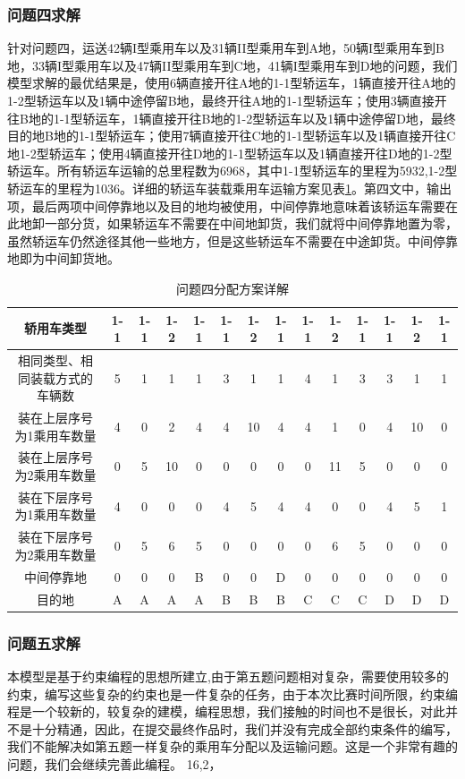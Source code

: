 \documentclass[UTF8]{ctexart}
\begin{document}
\subsubsection{问题四求解}
针对问题四，运送42辆I型乘用车以及31辆II型乘用车到A地，50辆I型乘用车到B地，33辆I型乘用车以及47辆II型乘用车到C地，41辆I型乘用车到D地的问题，我们模型求解的最优结果是，使用6辆直接开往A地的1-1型轿运车，1辆直接开往A地的1-2型轿运车以及1辆中途停留B地，最终开往A地的1-1型轿运车；使用3辆直接开往B地的1-1型轿运车，1辆直接开往B地的1-2型轿运车以及1辆中途停留D地，最终目的地B地的1-1型轿运车；使用7辆直接开往C地的1-1型轿运车以及1辆直接开往C地1-2型轿运车；使用4辆直接开往D地的1-1型轿运车以及1辆直接开往D地的1-2型轿运车。所有轿运车运输的总里程数为6968，其中1-1型轿运车的里程为5932,1-2型轿运车的里程为1036。详细的轿运车装载乘用车运输方案见表\ref{tab:answer4}。第四文中，输出项，最后两项中间停靠地以及目的地均被使用，中间停靠地意味着该轿运车需要在此地卸一部分货，如果轿运车不需要在中间地卸货，我们就将中间停靠地置为零，虽然轿运车仍然途径其他一些地方，但是这些轿运车不需要在中途卸货。中间停靠地即为中间卸货地。
\begin{table}[h!]
\centering
\caption{问题四分配方案详解}\label{tab:answer4}
\begin{tabular}{|c|c|c|c|c|c|c|c|c|c|c|c|c|c|}
\hline
轿用车类型 & 1-1 & 1-1 & 1-2 & 1-1 & 1-1 & 1-2 & 1-1 & 1-1 & 1-2 & 1-1 & 1-1 & 1-2 & 1-1\\ \hline 
相同类型、相同装载方式的车辆数 & 5 & 1 & 1 & 1 & 3 & 1 & 1 & 4 & 1 & 3 & 3 & 1 & 1\\ \hline 
装在上层序号为1乘用车数量 & 4 & 0 & 2 & 4 & 4 & 10 & 4 & 4 & 1 & 0 & 4 & 10 & 0\\ \hline 
装在上层序号为2乘用车数量 & 0 & 5 & 10 & 0 & 0 & 0 & 0 & 0 & 11 & 5 & 0 & 0 & 0\\ \hline 
装在下层序号为1乘用车数量 & 4 & 0 & 0 & 0 & 4 & 5 & 4 & 4 & 0 & 0 & 4 & 5 & 1\\ \hline 
装在下层序号为2乘用车数量 & 0 & 5 & 6 & 5 & 0 & 0 & 0 & 0 & 6 & 5 & 0 & 0 & 0\\ \hline 
中间停靠地 & 0 & 0 & 0 & B & 0 & 0 & D & 0 & 0 & 0 & 0 & 0 & 0\\ \hline 
目的地 & A & A & A & A & B & B & B & C & C & C & D & D & D\\ \hline 
\end{tabular}
\end{table}


\subsubsection{问题五求解}
本模型是基于约束编程的思想所建立,由于第五题问题相对复杂，需要使用较多的约束，编写这些复杂的约束也是一件复杂的任务，由于本次比赛时间所限，约束编程是一个较新的，较复杂的建模，编程思想，我们接触的时间也不是很长，对此并不是十分精通，因此，在提交最终作品时，我们并没有完成全部约束条件的编写，我们不能解决如第五题一样复杂的乘用车分配以及运输问题。这是一个非常有趣的问题，我们会继续完善此编程。
16,2，
\end{document}
